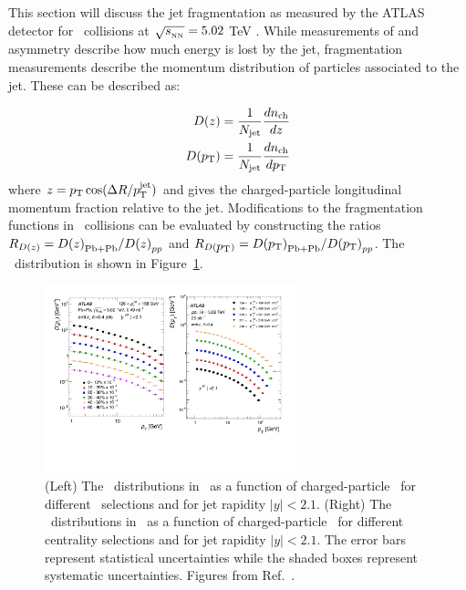 
This section will discuss the jet fragmentation as measured by the ATLAS detector for \pbpb\ collisions at $\mbox{$\sqrt{s_{_\text{NN}}}$} = 5.02$ TeV \cite{PhysRevC.98.024908}.
While measurements of \RAA \cite{20151, Aad:2014bxa, Khachatryan:2016jfl} and asymmetry \cite{Aaboud:2017eww, Chatrchyan:2011sx, PhysRevLett.119.062301} describe how much energy is lost by the jet, fragmentation measurements describe the momentum distribution of particles associated to the jet.
These can be described as:

\begin{align}
\mbox{$D(z)$} = \frac{1}{\mbox{$N_{\mathrm{jet}}$}} \frac{d\mbox{$n_{\mathrm{ch}}$}}{dz} \\
\mbox{$D(\mbox{$p_{\mathrm{T}}$})$} = \frac{1}{\mbox{$N_{\mathrm{jet}}$}} \frac{d\mbox{$n_{\mathrm{ch}}$}}{d\mbox{$p_{\mathrm{T}}$}}
\end{align}
where $z = \mbox{$p_{\mathrm{T}}$} \cos(\Delta R / \mbox{$p_{\mathrm{T}}^{\mathrm{jet}}$})$ and gives the charged-particle longitudinal momentum fraction relative to the jet.
Modifications to the fragmentation functions in \pbpb\ collisions can be evaluated by constructing the ratios $\mbox{$R_{D(z)}$} = \mbox{$D(z)$}_{\rm Pb+Pb} / \mbox{$D(z)$}_{pp}$ and $\mbox{$R_{D(\mbox{$p_{\mathrm{T}}$})}$} = \mbox{$D(\mbox{$p_{\mathrm{T}}$})$}_{\rm Pb+Pb} / \mbox{$D(\mbox{$p_{\mathrm{T}}$})$}_{pp}$.
The \Dpt\ distribution is shown in Figure~\ref{fig:jetff_dpt}.

\begin{figure}[htbp]
\begin{center}
\includegraphics[width=0.65\textwidth]{figures/jetMeasurements/jetff_dpt}
\caption{(Left) The \Dpt\ distributions in \pp\ as a function of charged-particle \pt\ for different \ptjet\ selections and for jet rapidity $|y| < 2.1$.
(Right) The \Dpt\ distributions in \pbpb\ as a function of charged-particle \pt\ for different centrality selections and for jet rapidity $|y| < 2.1$.
The error bars represent statistical uncertainties while the shaded boxes represent systematic uncertainties.
Figures from Ref.~\cite{PhysRevC.98.024908}.}
\label{fig:jetff_dpt}
\end{center}
\end{figure}


